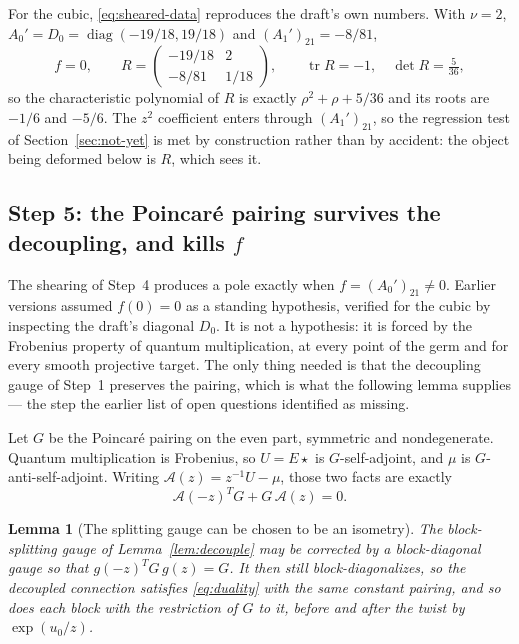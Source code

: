 \documentclass[11pt]{article}
\newtheorem{lemma}[theorem]{Lemma}
\theoremstyle{definition}
\theoremstyle{remark}
\begin{document}
For the cubic, \eqref{eq:sheared-data} reproduces the draft's own numbers. With
$\nu=2$, $A_0'=D_0=\operatorname{diag}(-19/18,19/18)$ and $(A_1')_{21}=-8/81$,
\[
  f=0,\qquad
  R=\begin{pmatrix}-19/18&2\\-8/81&1/18\end{pmatrix},
  \qquad
  \operatorname{tr}R=-1,\quad\det R=\tfrac5{36},
\]
so the characteristic polynomial of $R$ is exactly $\rho^2+\rho+5/36$ and its
roots are $-1/6$ and $-5/6$. The $z^2$ coefficient enters through
$(A_1')_{21}$, so the regression test of Section~\ref{sec:not-yet} is met by
construction rather than by accident: the object being deformed below is $R$,
which sees it.

\subsection*{Step 5: the Poincar\'e pairing survives the decoupling, and kills
$f$}

The shearing of Step~4 produces a pole exactly when $f=(A_0')_{21}\ne0$.
Earlier versions assumed $f(0)=0$ as a standing hypothesis, verified for the
cubic by inspecting the draft's diagonal $D_0$. It is not a hypothesis: it is
forced by the Frobenius property of quantum multiplication, at every point of
the germ and for every smooth projective target. The only thing needed is that
the decoupling gauge of Step~1 preserves the pairing, which is what the
following lemma supplies --- the step the earlier list of open questions
identified as missing.

Let $G$ be the Poincar\'e pairing on the even part, symmetric and
nondegenerate. Quantum multiplication is Frobenius, so $U=E\star$ is
$G$-self-adjoint, and $\mu$ is $G$-anti-self-adjoint. Writing
$\mathcal A(z)=z^{-1}U-\mu$, those two facts are exactly
\[
  \mathcal A(-z)^TG+G\,\mathcal A(z)=0.
  \tag{8.4}
  \label{eq:duality}
\]

\begin{lemma}[The splitting gauge can be chosen to be an isometry]
\label{lem:duality-gauge}
The block-splitting gauge of Lemma~\ref{lem:decouple} may be corrected by a
block-diagonal gauge so that $g(-z)^TG\,g(z)=G$. It then still block-diagonalizes,
so the decoupled connection satisfies \eqref{eq:duality} with the same constant
pairing, and so does each block with the restriction of $G$ to it, before and
after the twist by $\exp(u_0/z)$.
\end{lemma}
\end{document}
